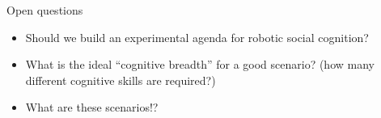 \documentclass[compress]{beamer}
\begin{document}
\begin{frame}{Open questions}

    \begin{itemize}
        \item Should we build an experimental agenda for robotic social cognition?
        \item What is the ideal ``cognitive breadth'' for a good scenario? (how many
            different cognitive skills are required?)
        \item What are these scenarios!?
    \end{itemize}
\end{frame}

%
%
%
%
%
%
%
%
%
\end{document}
